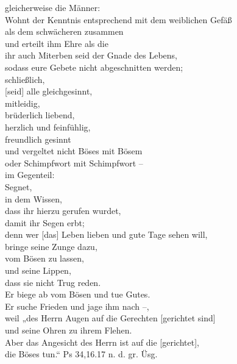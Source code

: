         gleicherweise die Männer: \\
            Wohnt der Kenntnis entsprechend mit dem weiblichen Gefäß \\
            als dem schwächeren zusammen \\
            und erteilt ihm Ehre als die \\
                ihr auch Miterben seid der Gnade des Lebens, \\
                sodass eure Gebete nicht abgeschnitten werden; \\
        schließlich, \\
            [seid] alle gleichgesinnt, \\
                mitleidig, \\
                brüderlich liebend, \\
                herzlich und feinfühlig, \\
                freundlich gesinnt\\
                und vergeltet nicht Böses mit Bösem \\
                oder Schimpfwort mit Schimpfwort – \\
            im Gegenteil: \\
                Segnet, \\
                in dem Wissen, \\
                dass ihr hierzu gerufen wurdet, \\
                damit ihr Segen erbt; \\
            denn wer [das] Leben lieben und gute Tage sehen will, \\
                bringe seine Zunge dazu, \\
                vom Bösen zu lassen, \\
                und seine Lippen, \\
                dass sie nicht Trug reden. \\
            Er biege ab vom Bösen und tue Gutes. \\
            Er suche Frieden und jage ihm nach –, \\
                weil „des Herrn Augen auf die Gerechten [gerichtet sind] \\
                und seine Ohren zu ihrem Flehen. \\
                Aber das Angesicht des Herrn ist auf die [gerichtet], \\
                die Böses tun.“ {Ps 34,16.17 n. d. gr. Üsg.} \\

